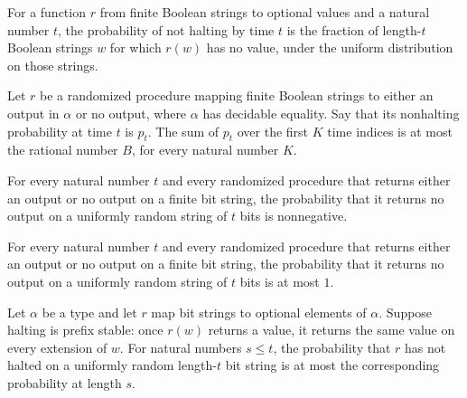 \begin{definition}
\label{Randomized.notHaltedProb}
\leanok
{}
For a function $r$ from finite Boolean strings to optional values and a natural number
$t$, the probability of not halting by time $t$ is the fraction of length-$t$ Boolean
strings $w$ for which $r(w)$ has no value, under the uniform distribution on those
strings.
\end{definition}

\begin{definition}
\label{Randomized.ExpTimeLe}
\leanok
{}
Let $r$ be a randomized procedure mapping finite Boolean strings to either an output in
$\alpha$ or no output, where $\alpha$ has decidable equality. Say that its nonhalting
probability at time $t$ is $p_t$. The sum of $p_t$ over the first $K$ time indices is at
most the rational number $B$, for every natural number $K$.
\end{definition}

\begin{theorem}
\label{Randomized.notHaltedProb_nonneg}
\leanok
{}
For every natural number $t$ and every randomized procedure that returns either an
output or no output on a finite bit string, the probability that it returns no output on
a uniformly random string of $t$ bits is nonnegative.
\end{theorem}

\begin{theorem}
\label{Randomized.notHaltedProb_le_one}
\leanok
{}
For every natural number $t$ and every randomized procedure that returns either an
output or no output on a finite bit string, the probability that it returns no output on
a uniformly random string of $t$ bits is at most $1$.
\end{theorem}

\begin{theorem}
\label{Randomized.notHaltedProb_le_of_le}
\leanok
{}
Let $\alpha$ be a type and let $r$ map bit strings to optional elements of $\alpha$. Suppose
halting is prefix stable: once $r(w)$ returns a value, it returns the same value on
every extension of $w$. For natural numbers $s\le t$, the probability that $r$ has not
halted on a uniformly random length-$t$ bit string is at most the corresponding
probability at length $s$.
\end{theorem}


